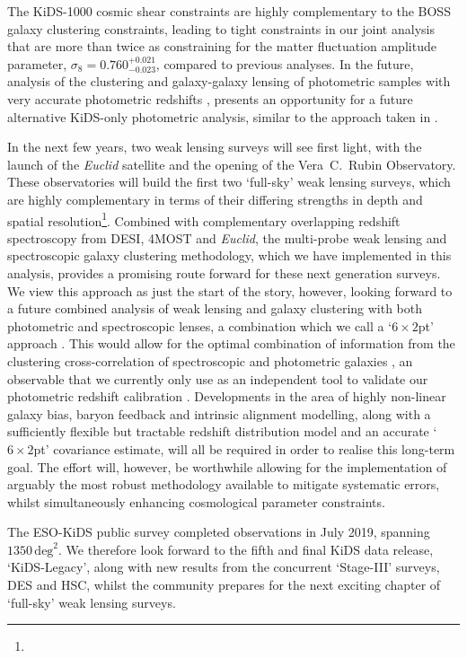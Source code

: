 The KiDS-1000 cosmic shear constraints are highly complementary to the BOSS galaxy clustering constraints, leading to tight constraints in our joint \tttp analysis that are more than twice as constraining for the matter fluctuation amplitude parameter, $\sigma_8 = 0.760^{+0.021}_{-0.023}$, compared to previous \tttp analyses.    In the future, analysis of the clustering and galaxy-galaxy lensing of photometric samples with very accurate photometric redshifts \citep[see for example][]{vakili/etal:2019}, presents an opportunity for a future alternative KiDS-only \tttp photometric analysis, similar to the approach taken in \citet{abbott/etal:2018}.

In the next few years, two weak lensing surveys will see first light, with the launch of the {\it Euclid} satellite and the opening of the Vera~C.~Rubin Observatory.   These observatories will build the first two `full-sky' weak lensing surveys, which are highly complementary in terms of their differing strengths in depth and spatial resolution\footnote{}.  Combined with complementary overlapping redshift spectroscopy from DESI, 4MOST and {\it Euclid}, the multi-probe weak lensing and spectroscopic galaxy clustering methodology, which we have implemented in this analysis, provides a promising route forward for these next generation surveys.   We view this \tttp approach as just the start of the story, however, looking forward to a future combined analysis of weak lensing and galaxy clustering with both photometric and spectroscopic lenses, a combination which we call a `$6\times2$pt' approach \citep{bernstein:2009}.    This would allow for the optimal combination of information from the clustering cross-correlation of spectroscopic and photometric galaxies \citep{newman:2008}, an observable that we currently only use as an independent tool to validate our photometric redshift calibration \citep{hildebrandt/etal:inprep}.      Developments in the area of highly non-linear galaxy bias, baryon feedback and intrinsic alignment modelling, along with a sufficiently flexible but tractable redshift distribution model and an accurate `$6\times2$pt' covariance estimate, will all be required in order to realise this long-term goal.   The effort will, however, be worthwhile allowing for the implementation of arguably the most robust methodology available to mitigate systematic errors, whilst simultaneously enhancing cosmological parameter constraints.

The ESO-KiDS public survey completed observations in July 2019, spanning $1350\,\mathrm{deg}^{2}$.   We therefore look forward to the fifth and final KiDS data release, `KiDS-Legacy', along with new results from the concurrent `Stage-III' surveys, DES and HSC, whilst the community prepares for the next exciting chapter of `full-sky' weak lensing surveys.  